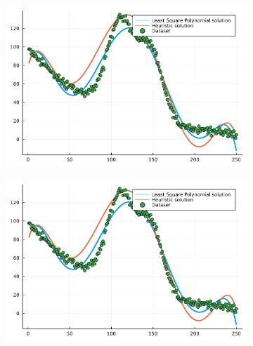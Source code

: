 \documentclass[12pt,a4paper]{article}
\begin{document}
\begin{figure}[H]
    \centering
    \begin{subfigure}{0.6\textwidth}
        \includegraphics[width=\linewidth]{../figs/methaeuristic_regression_result1.png}
    \end{subfigure}
\end{figure}%
\begin{figure}[H]\ContinuedFloat
    \centering
    \begin{subfigure}{0.6\textwidth}
        \includegraphics[width=\linewidth]{../figs/methaeuristic_regression_result2.png}
    \end{subfigure}
\end{figure}    
\end{document}
